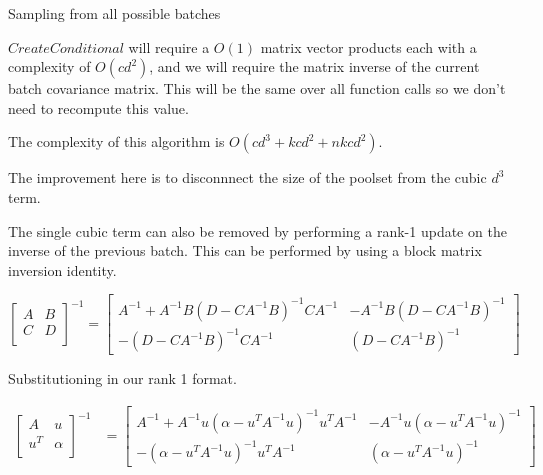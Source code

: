 \documentclass[12pt, a4paper]{report}
\theoremstyle{definition}
\theoremstyle{definition}
\theoremstyle{definition}
\begin{document}
\begin{algorithm}[H]
    \SetAlgoLined
     \caption{Sampling from all possible batches}
\end{algorithm}

$CreateConditional$ will require a $O(1)$ matrix vector products each with a complexity of $O(cd^2)$, and we will require the matrix inverse of the current batch covariance matrix. This will be the same over all function calls so we don't need to recompute this value.

The complexity of this algorithm is $O\left(cd^3 + kcd^2 + nkcd^2 \right)$.

The improvement here is to disconnnect the size of the poolset from the cubic $d^3$ term.

The single cubic term can also be removed by performing a rank-1 update on the inverse of the previous batch. This can be performed by using a block matrix inversion identity.

$$\begin{bmatrix}
    A & B \\
    C & D \\
\end{bmatrix}^{-1} = \begin{bmatrix}
    A^{-1} + A^{-1} B \left(D - C A^{-1} B \right)^{-1} C A^{-1} & -A^{-1} B \left( D - C A^{-1}B\right)^{-1} \\
    - \left(D - CA^{-1}B \right)^{-1} C A^{-1} & \left(D - C A^{-1} B\right)^{-1}
\end{bmatrix} $$ 

Substitutioning in our rank 1 format.

\begin{align*}
    \begin{bmatrix}
        A & u \\
        u^T & \alpha \\
    \end{bmatrix}^{-1} &= \begin{bmatrix}
        A^{-1} + A^{-1} u \left(\alpha - u^T A^{-1} u \right)^{-1} u^T  A^{-1} & -A^{-1} u \left( \alpha - u^T A^{-1}u\right)^{-1} \\
        - \left(\alpha - u^T A^{-1}u \right)^{-1} u^T A^{-1} & \left(\alpha - u^T A^{-1} u\right)^{-1}
    \end{bmatrix}
\end{align*}
\end{document}
